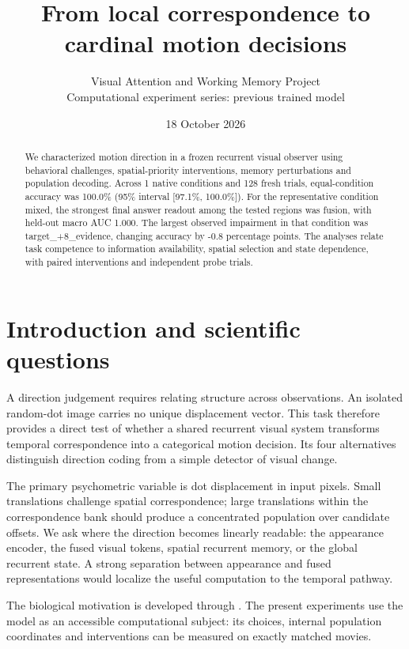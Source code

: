 \documentclass[11pt]{article}
\begin{document}
\title{\color{ink}From local correspondence to cardinal motion decisions}
\author{Visual Attention and Working Memory Project\\Computational experiment series: previous trained model}\date{18 October 2026}\maketitle
\begin{abstract}
We characterized motion direction in a frozen recurrent visual observer using behavioral challenges, spatial-priority interventions, memory perturbations and population decoding. Across 1 native conditions and 128 fresh trials, equal-condition accuracy was 100.0\% (95\% interval [97.1\%, 100.0\%]). For the representative condition mixed, the strongest final answer readout among the tested regions was fusion, with held-out macro AUC 1.000. The largest observed impairment in that condition was target\_\allowbreak{}+8\_\allowbreak{}evidence, changing accuracy by -0.8 percentage points. The analyses relate task competence to information availability, spatial selection and state dependence, with paired interventions and independent probe trials.
\end{abstract}
\section{Introduction and scientific questions}
A direction judgement requires relating structure across observations. An isolated random-dot image carries no unique displacement vector. This task therefore provides a direct test of whether a shared recurrent visual system transforms temporal correspondence into a categorical motion decision. Its four alternatives distinguish direction coding from a simple detector of visual change.

The primary psychometric variable is dot displacement in input pixels. Small translations challenge spatial correspondence; large translations within the correspondence bank should produce a concentrated population over candidate offsets. We ask where the direction becomes linearly readable: the appearance encoder, the fused visual tokens, spatial recurrent memory, or the global recurrent state. A strong separation between appearance and fused representations would localize the useful computation to the temporal pathway.

The biological motivation is developed through \cite{salzman}. The present experiments use the model as an accessible computational subject: its choices, internal population coordinates and interventions can be measured on exactly matched movies.
\end{document}
